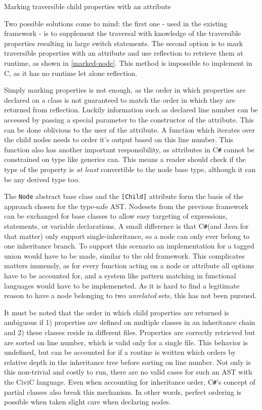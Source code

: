 \documentclass[twoside,openright]{uva-bachelor-thesis}
\newcommand{\code}[1]{\texttt{\footnotesize#1}}
\newcommand{\cs}{C\texttt{\#}\xspace}
\begin{document}
		\begin{codebox}[label=marked-node]{Marking traversible child properties with an attribute}
		\end{codebox}
				
		Two possible solutions come to mind: the first one - used in the existing framework - is to supplement the traversal with knowledge of the traversible properties resulting in large switch statements. The second option is to mark traversible properties with an attribute and use reflection to retrieve them at runtime, as shown in \cref{marked-node}. This method is impossible to implement in C, as it has no runtime let alone reflection.
		
		Simply marking properties is not enough, as the order in which properties are declared on a class is not guaranteed to match the order in which they are returned from reflection. Luckily information such as declared line number can be accessed by passing a special parameter to the constructor of the attribute. This can be done oblivious to the user of the attribute. A function which iterates over the child nodes needs to order it's output based on this line number. This function also has another important responsibility, as attributes in \cs cannot be constrained on type like generics can. This means a reader should check if the type of the property is \emph{at least} convertible to the node base type, although it can be any derived type too.
		
		The \code{Node} abstract base class and the \code{[Child]} attribute form the basis of the approach chosen for the type-safe AST. Nodesets from the previous framework can be exchanged for base classes to allow easy targeting of expressions, statements, or variable declarations. A small difference is that \cs (and Java for that matter) only support single-inheritance, so a node can only ever belong to one inheritance branch. To support this scenario an implementation for a tagged union would have to be made, similar to the old framework. This complicates matters immensly, as for every function acting on a node or attribute all options have to be accounted for, and a system like pattern matching in functional languages would have to be implemeneted. As it is hard to find a legitimate reason to have a node belonging to two \emph{unrelated} sets, this has not been pursued.
		
		It must be noted that the order in which child properties are returned is ambiguous if 1) properties are defined on multiple classes in an inheritance chain and 2) these classes reside in different files. Properties are correctly retrieved but are sorted on line number, which is valid only for a single file. This behavior is undefined, but can be accounted for if a routine is written which orders by relative depth in the inheritance tree before sorting on line number. Not only is this non-trivial and costly to run, there are no valid cases for such an AST with the CiviC language. Even when accounting for inheritance order, \cs's concept of partial classes also break this mechanism. In other words, perfect ordering is possible when taken slight care when declaring nodes.
		
\end{document}
